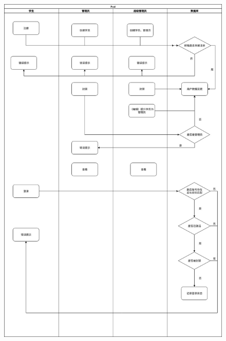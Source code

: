 \documentclass{article}
\begin{document}
        \begin{figure}[H]
            \centering
            \includegraphics[width=.8\textwidth]{./UserManageMent.jpg}
        \end{figure}
\end{document}
